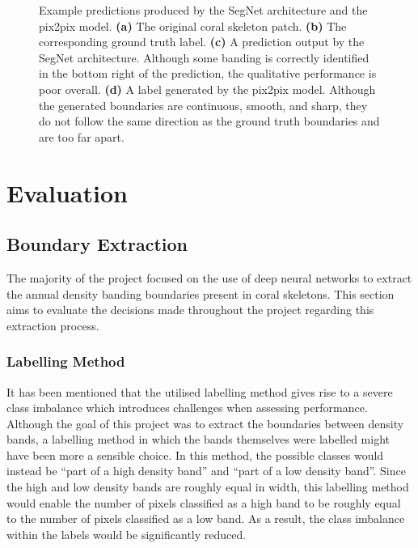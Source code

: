 \begin{figure}[!t]
\begin{subfigure}[t]{0.24\textwidth}
        \caption{}
        \label{fig:pixexample}
    \end{subfigure}
    \caption{Example predictions produced by the SegNet architecture and the pix2pix model. \textbf{(a)} The original coral skeleton patch. \textbf{(b)} The corresponding ground truth label. \textbf{(c)} A prediction output by the SegNet architecture. Although some banding is correctly identified in the bottom right of the prediction, the qualitative performance is poor overall. \textbf{(d)} A label generated by the pix2pix model. Although the generated boundaries are continuous, smooth, and sharp, they do not follow the same direction as the ground truth boundaries and are too far apart.}
    \label{fig:segpixexample}
\end{figure}

\section{Evaluation}

\subsection{Boundary Extraction}

The majority of the project focused on the use of deep neural networks to extract the annual density banding boundaries present in coral skeletons. This section aims to evaluate the decisions made throughout the project regarding this extraction process.

\subsubsection{Labelling Method}
\label{sec:evallabel}

It has been mentioned that the utilised labelling method gives rise to a severe class imbalance which introduces challenges when assessing performance. Although the goal of this project was to extract the boundaries between density bands, a labelling method in which the bands themselves were labelled might have been more a sensible choice. In this method, the possible classes would instead be ``part of a high density band'' and ``part of a low density band''. Since the high and low density bands are roughly equal in width, this labelling method would enable the number of pixels classified as a high band to be roughly equal to the number of pixels classified as a low band. As a result, the class imbalance within the labels would be significantly reduced.

